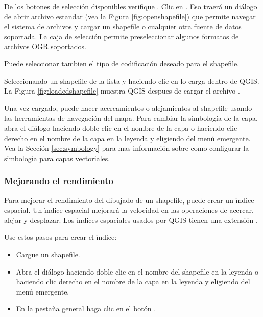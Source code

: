 De los botones de selecci\'on disponibles verifique . Clic en . Eso traer\'a un di\'alogo de abrir archivo estandar (vea la Figura \ref{fig:openshapefile}) que permite navegar el sistema de archivos y cargar un  shapefile o cualquier otra fuente de datos soportada. 
La caja de selecci\'on  permite preseleccionar algunos formatos de archivos OGR soportados.

Puede seleccionar tambien el tipo de codificaci\'on deseado para el shapefile.

Seleccionando un shapefile de la lista y haciendo clic en  lo carga dentro de QGIS. La Figura
\ref{fig:loadedshapefile} muestra QGIS despues de cargar el archivo .


\begin{Tip}\caption{\textsc{Colores de la capa}}
\end{Tip}

Una vez cargado, puede hacer acercamientos o alejamientos al shapefile usando las herramientas de navegaci\'on del mapa.
Para cambiar la simbolog\'ia de la capa, abra el di\'alogo  haciendo doble clic en el nombre de la capa o haciendo clic derecho en el nombre de la capa en la leyenda y eligiendo  del men\'u emergente. Vea la  Secci\'on \ref{sec:symbology} para mas informaci\'on sobre como configurar la simbolog\'{\i}a para capas vectoriales.
  
\subsubsection{Mejorando el rendimiento}

Para mejorar el rendimiento del dibujado de un shapefile, puede crear un \'{\i}ndice espacial. Un \'{\i}ndice espacial  mejorar\'a la velocidad en las operaciones de acercar, alejar y desplazar. Los \'{\i}ndices espaciales usados por QGIS tienen una extensi\'on .

Use estos pasos para crear el \'{\i}ndice:

\begin{itemize}
\item Cargue un shapefile.
\item Abra el di\'alogo  haciendo doble clic en el nombre del shapefile en la leyenda o haciendo clic derecho en el nombre de la capa en la leyenda y eligiendo  del men\'u emergente.
\item En la pesta\~na general  haga clic en el bot\'on .
\end{itemize}

